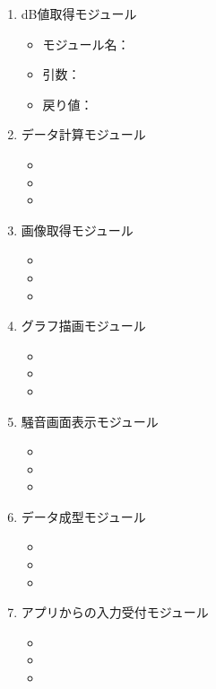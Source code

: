 \begin{enumerate}
\item dB値取得モジュール
\begin{itemize}
\item モジュール名：
\item 引数：
\item 戻り値：
\end{itemize}
\item データ計算モジュール
\begin{itemize}
\item 
\item 
\item
\end{itemize}
\item 画像取得モジュール
\begin{itemize}
\item 
\item 
\item
\end{itemize}
\item グラフ描画モジュール
\begin{itemize}
\item 
\item 
\item
\end{itemize}
\item 騒音画面表示モジュール
\begin{itemize}
\item 
\item 
\item
\end{itemize}
\item データ成型モジュール
\begin{itemize}
\item 
\item 
\item
\end{itemize}
\item アプリからの入力受付モジュール
\begin{itemize}
\item 
\item 
\item
\end{itemize}
\end{enumerate}
